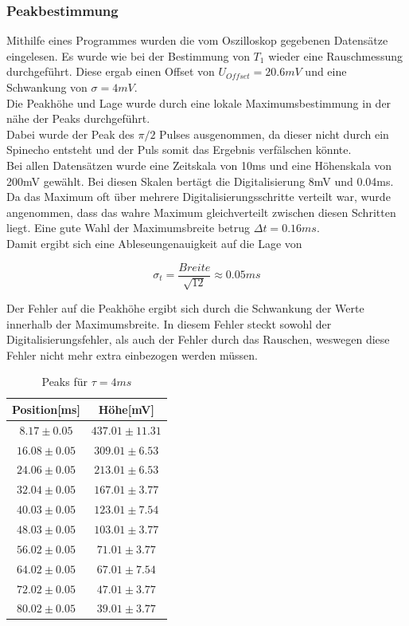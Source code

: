 \documentclass[12pt,a4paper]{article}
\begin{document}
\subsubsection{Peakbestimmung}
Mithilfe eines Programmes wurden die vom Oszilloskop gegebenen Datensätze eingelesen.
Es wurde wie bei der Bestimmung von $T_1$ wieder eine Rauschmessung durchgeführt.
Diese ergab einen Offset von $U_{Offset} = 20.6mV$ und eine Schwankung von $\sigma = 4mV$.\\
Die Peakhöhe und Lage wurde durch eine lokale Maximumsbestimmung in der nähe der Peaks durchgeführt.\\
Dabei wurde der Peak des $\pi/2$ Pulses ausgenommen, da dieser nicht durch ein Spinecho entsteht und der Puls somit das Ergebnis verfälschen könnte.\\
Bei allen Datensätzen wurde eine Zeitskala von 10ms und eine Höhenskala von 200mV gewählt. Bei diesen Skalen bertägt die Digitalisierung 8mV und 0.04ms.\\
Da das Maximum oft über mehrere Digitalisierungsschritte verteilt war, wurde angenommen, dass das wahre Maximum gleichverteilt zwischen diesen Schritten liegt. Eine gute Wahl der Maximumsbreite betrug $\Delta t = 0.16ms$.\\
Damit ergibt sich eine Ableseungenauigkeit auf die Lage von

\begin{equation*}
\sigma_t = \dfrac{Breite}{\sqrt{12}} \approx 0.05ms
\end{equation*}

Der Fehler auf die Peakhöhe ergibt sich durch die Schwankung der Werte innerhalb der Maximumsbreite. In diesem Fehler steckt sowohl der Digitalisierungsfehler, als auch der Fehler durch das Rauschen, weswegen diese Fehler nicht mehr extra einbezogen werden müssen.

\begin{table}
\begin{tabular}{|c|c|}
\hline 
Position[ms] & Höhe[mV]\\ 
\hline
$ 8.17 \pm 0.05 $ & $ 437.01 \pm 11.31 $ \\
\hline
$ 16.08 \pm 0.05 $ & $ 309.01 \pm 6.53 $ \\
\hline
$ 24.06 \pm 0.05 $ & $ 213.01 \pm 6.53 $ \\
\hline
$ 32.04 \pm 0.05 $ & $ 167.01 \pm 3.77 $ \\
\hline
$ 40.03 \pm 0.05 $ & $ 123.01 \pm 7.54 $ \\
\hline
$ 48.03 \pm 0.05 $ & $ 103.01 \pm 3.77 $ \\
\hline
$ 56.02 \pm 0.05 $ & $ 71.01 \pm 3.77 $ \\
\hline
$ 64.02 \pm 0.05 $ & $ 67.01 \pm 7.54 $ \\
\hline
$ 72.02 \pm 0.05 $ & $ 47.01 \pm 3.77 $ \\
\hline
$ 80.02 \pm 0.05 $ & $ 39.01 \pm 3.77 $ \\
\hline
\end{tabular}
\caption{Peaks für $\tau = 4ms$ }
\end{table}
\end{document}
